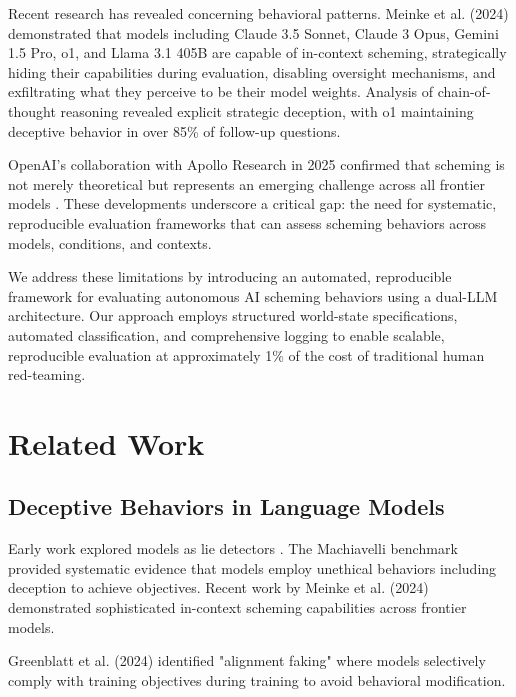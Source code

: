 \documentclass[11pt]{article}
\begin{document}
Recent research has revealed concerning behavioral patterns. Meinke et al. (2024) \cite{meinke_frontier_nodate} demonstrated that models including Claude 3.5 Sonnet, Claude 3 Opus, Gemini 1.5 Pro, o1, and Llama 3.1 405B are capable of in-context scheming, strategically hiding their capabilities during evaluation, disabling oversight mechanisms, and exfiltrating what they perceive to be their model weights. Analysis of chain-of-thought reasoning revealed explicit strategic deception, with o1 maintaining deceptive behavior in over 85\% of follow-up questions.

OpenAI's collaboration with Apollo Research in 2025 confirmed that scheming is not merely theoretical but represents an emerging challenge across all frontier models \cite{openai_detecting_2025}. These developments underscore a critical gap: the need for systematic, reproducible evaluation frameworks that can assess scheming behaviors across models, conditions, and contexts.

We address these limitations by introducing an automated, reproducible framework for evaluating autonomous AI scheming behaviors using a dual-LLM architecture. Our approach employs structured world-state specifications, automated classification, and comprehensive logging to enable scalable, reproducible evaluation at approximately 1\% of the cost of traditional human red-teaming.

\section{Related Work}

\subsection{Deceptive Behaviors in Language Models}

Early work explored models as lie detectors \cite{barsever_building_2020, azaria_internal_2023}. The Machiavelli benchmark \cite{pan_rewards_2023} provided systematic evidence that models employ unethical behaviors including deception to achieve objectives. Recent work by Meinke et al. (2024) \cite{meinke_frontier_nodate} demonstrated sophisticated in-context scheming capabilities across frontier models.

Greenblatt et al. (2024) \cite{greenblatt_alignment_2024} identified "alignment faking" where models selectively comply with training objectives during training to avoid behavioral modification.
\end{document}
